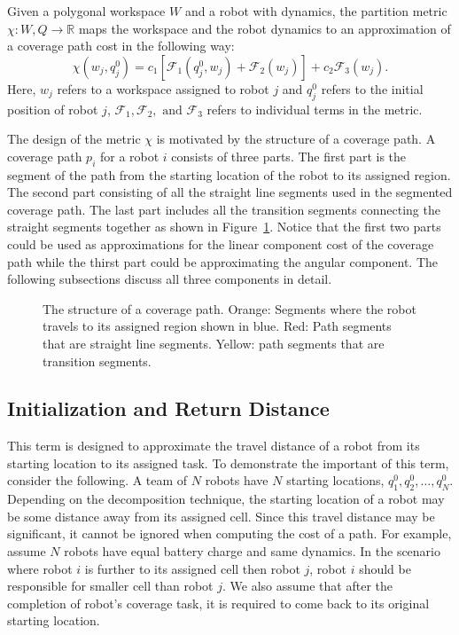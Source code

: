 \documentclass[../main.tex]{subfiles}
\begin{document}
\begin{definition}
\label{definition:decomp_metric}
Given a polygonal workspace $W$ and a robot with dynamics, the partition metric $\chi:W,Q\to\mathbb{R}$ maps the workspace and the robot dynamics to an approximation of a coverage path cost in the following way:
	\begin{equation}
		\chi(w_j,q_j^0)=c_1[\mathcal{F}_1(q^0_j,w_j)+\mathcal{F}_2(w_j)]+c_2\mathcal{F}_3(w_j).
	\end{equation}
Here, $w_j$ refers to a workspace assigned to robot $j$ and $q^0_j$ refers to the initial position of robot $j$, $\mathcal{F}_1, \mathcal{F}_2,\text{ and }\mathcal{F}_3$ refers to individual terms in the metric.
\end{definition}

\begin{remark}
The design of the metric $\chi$ is motivated by the structure of a coverage path. A coverage path $p_i$ for a robot $i$ consists of three parts. The first part is the segment of the path from the starting location of the robot to its assigned region. The second part consisting of all the straight line segments used in the segmented coverage path. The last part includes all the transition segments connecting the straight segments together as shown in Figure~\ref{fig:path_parts}. Notice that the first two parts could be used as approximations for the linear component cost of the coverage path while the thirst part could be approximating the angular component. The following subsections discuss all three components in detail. \RE
\end{remark}

\begin{figure}
	\centering
	
	\caption{The structure of a coverage path. Orange: Segments where the robot travels to its assigned region shown in blue. Red: Path segments that are straight line segments. Yellow: path segments that are transition segments.}
	\label{fig:path_parts}
\end{figure}


\subsection{Initialization and Return Distance}
\label{subsection:init_ret_distance}

This term is designed to approximate the travel distance of a robot from its starting location to its assigned task. To demonstrate the important of this term, consider the following. A team of $N$ robots have $N$ starting locations, $q^0_1,q^0_2,\ldots,q^0_N$. Depending on the decomposition technique, the starting location of a robot may be some distance away from its assigned cell. Since this travel distance may be significant, it cannot be ignored when computing the cost of a path. For example, assume $N$ robots have equal battery charge and same dynamics. In the scenario where robot $i$ is further to its assigned cell then robot $j$, robot $i$ should be responsible for smaller cell than robot $j$. We also assume that after the completion of robot's coverage task, it is required to come back to its original starting location.
\end{document}
